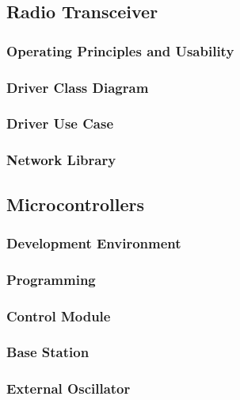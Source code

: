 
\subsection{Radio Transceiver}

\subsubsection{Operating Principles and Usability}

\subsubsection{Driver Class Diagram}

\subsubsection{Driver Use Case}

\subsubsection{Network Library}

\subsection{Microcontrollers}

\subsubsection{Development Environment}

\subsubsection{Programming}

\subsubsection{Control Module}

\subsubsection{Base Station}

\subsubsection{External Oscillator}


